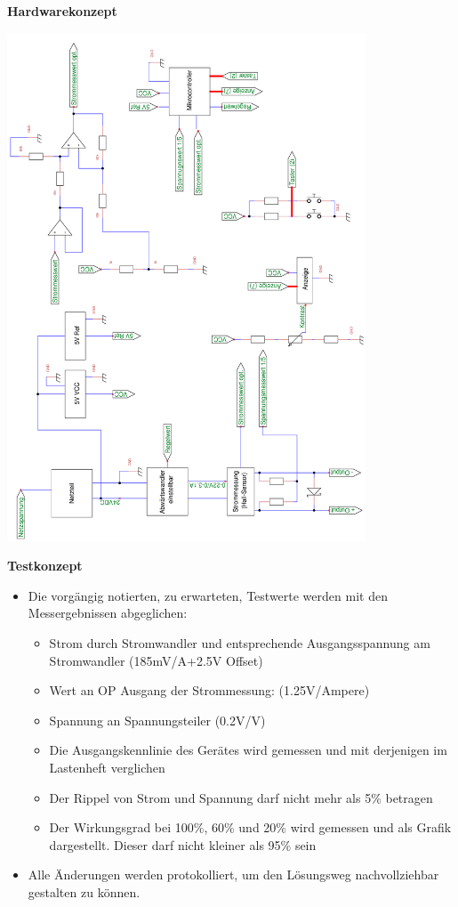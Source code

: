 \documentclass [12pt]{fhnwreport}
\begin{document}
\textbf{Hardwarekonzept}\\
\begin{center}
\includegraphics[angle=-90, width=0.8\textwidth]{Hardware_Prinzipschema.png}
\end{center}

\textbf{Testkonzept}
\begin{itemize}
	\item Die vorgängig notierten, zu erwarteten, Testwerte werden mit den Messergebnissen abgeglichen:
		\begin{itemize}
		\item Strom durch Stromwandler und entsprechende Ausgangsspannung am Stromwandler (185mV/A+2.5V Offset)
		\item Wert an OP Ausgang der Strommessung: (1.25V/Ampere)
		\item Spannung an Spannungsteiler (0.2V/V) 
		\item Die Ausgangskennlinie des Gerätes wird  gemessen und mit derjenigen im Lastenheft verglichen
		\item Der Rippel von Strom und Spannung darf nicht mehr als 5\% betragen
		\item Der Wirkungsgrad bei 100\%, 60\% und 20\% wird gemessen und als Grafik dargestellt. Dieser darf nicht kleiner als 95\% sein
		\end{itemize}
		
	\item Alle Änderungen werden protokolliert, um den Lösungsweg nachvollziehbar gestalten zu können.
\end{itemize}

%
\end{document}
